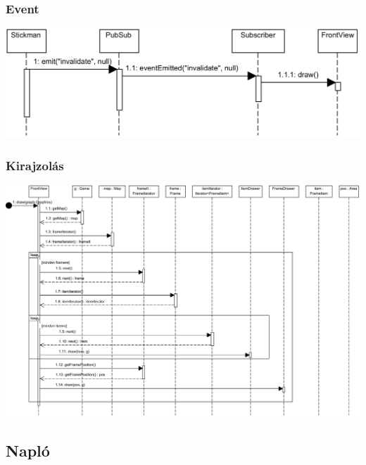 		\subsubsection{Event}
		    \begin{center}
			    \includegraphics[scale=0.88]{resources/event.png}
		    \end{center}

		\subsubsection{Kirajzolás}
		    \begin{center}
			    \includegraphics[scale=0.80, angle=-90]{resources/drawing.png}
		    \end{center}
	
		\subsection{Napló}
	

